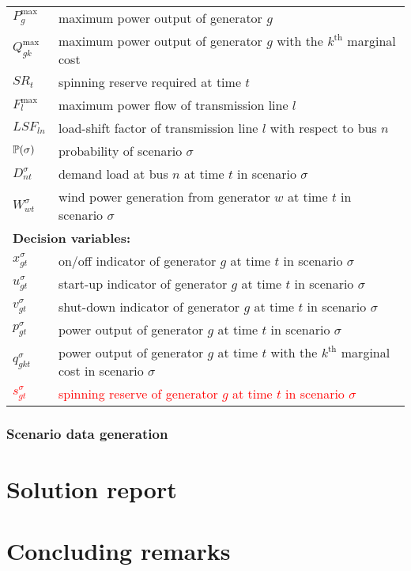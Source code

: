 \begin{table}[H]
\begin{tabular}{ll}
		$P^\text{max}_g$ & maximum power output of generator $g$ \\
		$Q^\text{max}_{gk}$ & maximum power output of generator $g$ with the $k^\textrm{th}$ marginal cost \\
		$SR_t$ & spinning reserve required at time $t$ \\
		$F^\text{max}_l$ & maximum power flow of transmission line $l$ \\
		$LSF_{ln}$ & load-shift factor of transmission line $l$ with respect to bus $n$ \\
		$\operatorname*{\mathbb{P}}(\sigma)$ & probability of scenario $\sigma$ \\
		$D_{nt}^\sigma$ & demand load at bus $n$ at time $t$ in scenario $\sigma$ \\
		$W_{wt}^\sigma$ & wind power generation from generator $w$ at time $t$ in scenario $\sigma$ \\ \midrule
		\multicolumn{2}{l}{\textbf{Decision variables:}} \\
		$x_{gt}^\sigma$ & on/off indicator of generator $g$ at time $t$ in scenario $\sigma$\\
		$u_{gt}^\sigma $ & start-up indicator of generator $g$ at time $t$ in scenario $\sigma$\\
		$v_{gt}^\sigma $ & shut-down indicator of generator $g$ at time $t$ in scenario $\sigma$ \\
		$p_{gt}^\sigma$ & power output of generator $g$ at time $t$ in scenario $\sigma$ \\
		$q_{gkt}^\sigma$ & power output of generator $g$ at time $t$ with the $k^\textrm{th}$ marginal cost in scenario $\sigma$\\
		\textcolor{red}{$s_{gt}^\sigma$} & \textcolor{red}{spinning reserve of generator $g$ at time $t$ in scenario $\sigma$} \\
		\hline
	\end{tabular}
\end{table}


\subsubsection{Scenario data generation}




\section{Solution report}


\section{Concluding remarks}

